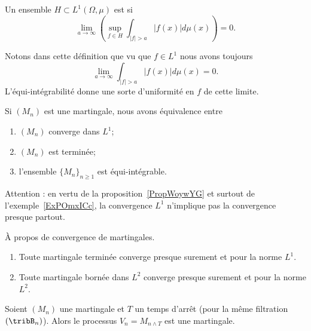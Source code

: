 \begin{definition}  \label{DefOZlZnse}
	Un ensemble \( H\subset L^1(\Omega,\mu)\) est  si
	\begin{equation}
		\lim_{a\to \infty}\left( \sup_{f\in H}\int_{  | f |>a   }| f(x) |d\mu(x) \right)=0.
	\end{equation}
\end{definition}
Notons dans cette définition que vu que \( f\in L^1\) nous avons toujours
\begin{equation}
	\lim_{a\to \infty}\int_{| f |>a}| f(x) |d\mu(x)=0.
\end{equation}
L'équi-intégrabilité donne une sorte d'uniformité en \( f\) de cette limite.

\begin{theorem} \label{ThoEFbpVXb}
	Si \( (M_n)\) est une martingale, nous avons équivalence entre
	\begin{enumerate}
		\item
		      \( (M_n)\) converge dans \( L^1\);
		\item
		      \( (M_n)\) est terminée;
		\item
		      l'ensemble \( \{ M_n \}_{n\geq 1}\) est équi-intégrable.
	\end{enumerate}
\end{theorem}

Attention : en vertu de la proposition~\ref{PropWoywYG} et surtout de l'exemple~\ref{ExPOmxICc}, la convergence \( L^1\) n'implique pas la convergence presque partout.

\begin{theorem}   \label{ThoHBvnTRk}
	À propos de convergence de martingales.
	\begin{enumerate}
		\item
		      Toute martingale terminée converge presque surement et pour la norme \( L^1\).
		\item
		      Toute martingale bornée dans \( L^2\) converge presque surement et pour la norme \( L^2\).
	\end{enumerate}
\end{theorem}

\begin{proposition} \label{PropAYJpGsc}
	Soient \( (M_n)\) une martingale et \( T\) un temps d'arrêt (pour la même filtration \( (\tribB_n)\)). Alors le processus \( V_n=M_{n\wedge T}\) est une martingale.
\end{proposition}

